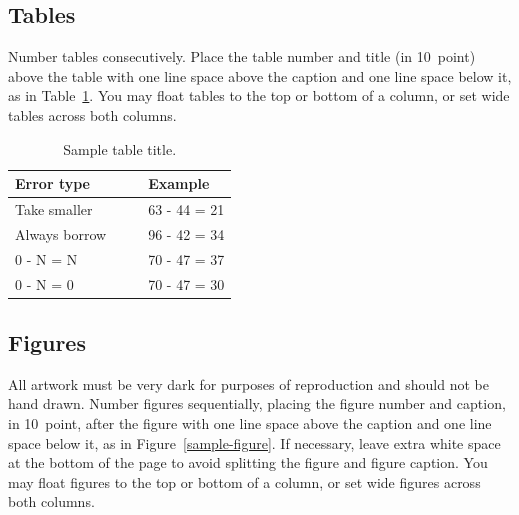 \documentclass[10pt,letterpaper]{article}
\begin{document}
\subsection{Tables}

Number tables consecutively. Place the table number and title (in
10~point) above the table with one line space above the caption and
one line space below it, as in Table~\ref{sample-table}. You may float
tables to the top or bottom of a column, or set wide tables across
both columns.

\begin{table}[!ht]
\begin{center} 
\caption{Sample table title.} 
\label{sample-table} 
\vskip 0.12in
\begin{tabular}{ll} 
\hline
Error type    &  Example \\
\hline
Take smaller        &   63 - 44 = 21 \\
Always borrow~~~~   &   96 - 42 = 34 \\
0 - N = N           &   70 - 47 = 37 \\
0 - N = 0           &   70 - 47 = 30 \\
\hline
\end{tabular} 
\end{center} 
\end{table}


\subsection{Figures}

All artwork must be very dark for purposes of reproduction and should
not be hand drawn. Number figures sequentially, placing the figure
number and caption, in 10~point, after the figure with one line space
above the caption and one line space below it, as in
Figure~\ref{sample-figure}. If necessary, leave extra white space at
the bottom of the page to avoid splitting the figure and figure
caption. You may float figures to the top or bottom of a column, or
set wide figures across both columns.
\end{document}
